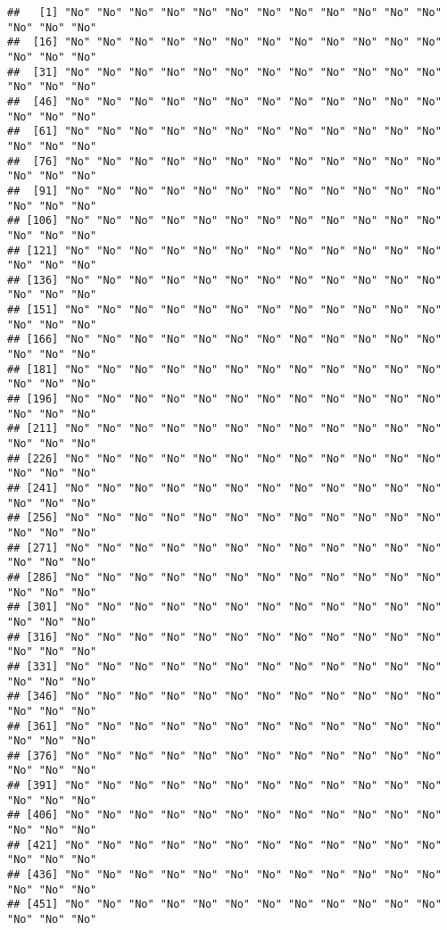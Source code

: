 \documentclass[
]{article}
\begin{document}
\begin{verbatim}
##   [1] "No" "No" "No" "No" "No" "No" "No" "No" "No" "No" "No" "No" "No" "No" "No"
##  [16] "No" "No" "No" "No" "No" "No" "No" "No" "No" "No" "No" "No" "No" "No" "No"
##  [31] "No" "No" "No" "No" "No" "No" "No" "No" "No" "No" "No" "No" "No" "No" "No"
##  [46] "No" "No" "No" "No" "No" "No" "No" "No" "No" "No" "No" "No" "No" "No" "No"
##  [61] "No" "No" "No" "No" "No" "No" "No" "No" "No" "No" "No" "No" "No" "No" "No"
##  [76] "No" "No" "No" "No" "No" "No" "No" "No" "No" "No" "No" "No" "No" "No" "No"
##  [91] "No" "No" "No" "No" "No" "No" "No" "No" "No" "No" "No" "No" "No" "No" "No"
## [106] "No" "No" "No" "No" "No" "No" "No" "No" "No" "No" "No" "No" "No" "No" "No"
## [121] "No" "No" "No" "No" "No" "No" "No" "No" "No" "No" "No" "No" "No" "No" "No"
## [136] "No" "No" "No" "No" "No" "No" "No" "No" "No" "No" "No" "No" "No" "No" "No"
## [151] "No" "No" "No" "No" "No" "No" "No" "No" "No" "No" "No" "No" "No" "No" "No"
## [166] "No" "No" "No" "No" "No" "No" "No" "No" "No" "No" "No" "No" "No" "No" "No"
## [181] "No" "No" "No" "No" "No" "No" "No" "No" "No" "No" "No" "No" "No" "No" "No"
## [196] "No" "No" "No" "No" "No" "No" "No" "No" "No" "No" "No" "No" "No" "No" "No"
## [211] "No" "No" "No" "No" "No" "No" "No" "No" "No" "No" "No" "No" "No" "No" "No"
## [226] "No" "No" "No" "No" "No" "No" "No" "No" "No" "No" "No" "No" "No" "No" "No"
## [241] "No" "No" "No" "No" "No" "No" "No" "No" "No" "No" "No" "No" "No" "No" "No"
## [256] "No" "No" "No" "No" "No" "No" "No" "No" "No" "No" "No" "No" "No" "No" "No"
## [271] "No" "No" "No" "No" "No" "No" "No" "No" "No" "No" "No" "No" "No" "No" "No"
## [286] "No" "No" "No" "No" "No" "No" "No" "No" "No" "No" "No" "No" "No" "No" "No"
## [301] "No" "No" "No" "No" "No" "No" "No" "No" "No" "No" "No" "No" "No" "No" "No"
## [316] "No" "No" "No" "No" "No" "No" "No" "No" "No" "No" "No" "No" "No" "No" "No"
## [331] "No" "No" "No" "No" "No" "No" "No" "No" "No" "No" "No" "No" "No" "No" "No"
## [346] "No" "No" "No" "No" "No" "No" "No" "No" "No" "No" "No" "No" "No" "No" "No"
## [361] "No" "No" "No" "No" "No" "No" "No" "No" "No" "No" "No" "No" "No" "No" "No"
## [376] "No" "No" "No" "No" "No" "No" "No" "No" "No" "No" "No" "No" "No" "No" "No"
## [391] "No" "No" "No" "No" "No" "No" "No" "No" "No" "No" "No" "No" "No" "No" "No"
## [406] "No" "No" "No" "No" "No" "No" "No" "No" "No" "No" "No" "No" "No" "No" "No"
## [421] "No" "No" "No" "No" "No" "No" "No" "No" "No" "No" "No" "No" "No" "No" "No"
## [436] "No" "No" "No" "No" "No" "No" "No" "No" "No" "No" "No" "No" "No" "No" "No"
## [451] "No" "No" "No" "No" "No" "No" "No" "No" "No" "No" "No" "No" "No" "No" "No"

\end{verbatim}
\end{document}
